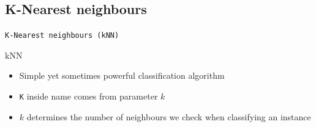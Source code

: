 \documentclass[aspectratio=169]{beamer}
\begin{document}
\subsection{K-Nearest neighbours}
\begin{frame}{}
    \begin{center}
        \Large{\texttt{K-Nearest neighbours (kNN)}}
    \end{center}
\end{frame}
\begin{frame}{kNN}
    \begin{itemize}
        \item Simple yet sometimes powerful classification algorithm
        \item \texttt{K} inside name comes from parameter $k$
        \item $k$ determines the number of neighbours we check when classifying an instance
    \end{itemize}
\end{frame}
\end{document}
